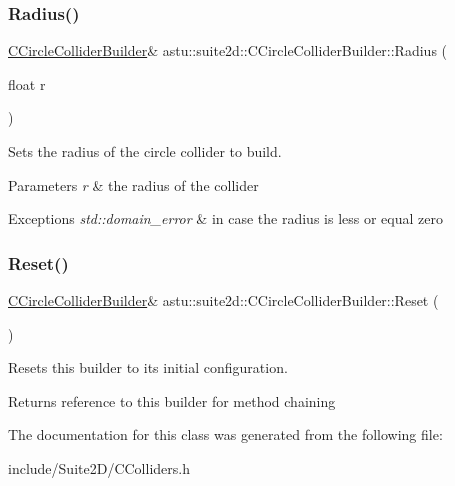 \subsubsection{\texorpdfstring{Radius()}{Radius()}}
{\footnotesize\ttfamily \hyperlink{classastu_1_1suite2d_1_1CCircleColliderBuilder}{C\+Circle\+Collider\+Builder}\& astu\+::suite2d\+::\+C\+Circle\+Collider\+Builder\+::\+Radius (\begin{DoxyParamCaption}\item[{float}]{r }\end{DoxyParamCaption})\hspace{0.3cm}{\ttfamily [inline]}}

Sets the radius of the circle collider to build.


\begin{DoxyParams}{Parameters}
{\em r} & the radius of the collider \\
\hline
\end{DoxyParams}

\begin{DoxyExceptions}{Exceptions}
{\em std\+::domain\+\_\+error} & in case the radius is less or equal zero \\
\hline
\end{DoxyExceptions}
\mbox{\label{classastu_1_1suite2d_1_1CCircleColliderBuilder_a0a946698baba5db84d97c648a79b224f}} 
\subsubsection{\texorpdfstring{Reset()}{Reset()}}
{\footnotesize\ttfamily \hyperlink{classastu_1_1suite2d_1_1CCircleColliderBuilder}{C\+Circle\+Collider\+Builder}\& astu\+::suite2d\+::\+C\+Circle\+Collider\+Builder\+::\+Reset (\begin{DoxyParamCaption}{ }\end{DoxyParamCaption})\hspace{0.3cm}{\ttfamily [inline]}}

Resets this builder to its initial configuration.

\begin{DoxyReturn}{Returns}
reference to this builder for method chaining 
\end{DoxyReturn}


The documentation for this class was generated from the following file\+:\begin{DoxyCompactItemize}
\item 
include/\+Suite2\+D/C\+Colliders.\+h\end{DoxyCompactItemize}
